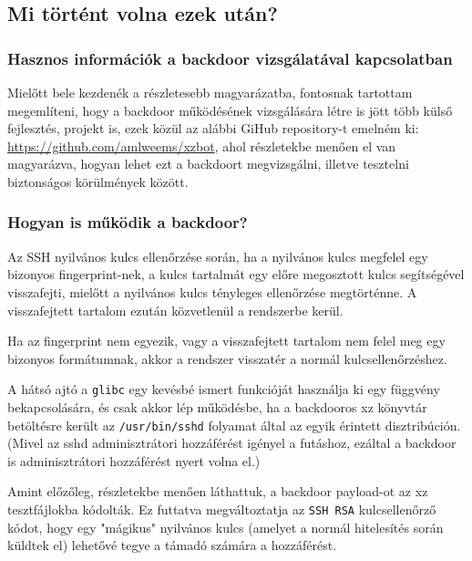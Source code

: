 \documentclass[11pt]{article}
\begin{document}
\subsection{Mi történt volna ezek után?}

\subsubsection{Hasznos információk a backdoor vizsgálatával kapcsolatban}

Mielőtt bele kezdenék a részletesebb magyarázatba, fontosnak tartottam megemlíteni, hogy a backdoor működésének vizsgálására létre is jött több külső fejlesztés, projekt is, ezek közül az alábbi GiHub repository-t emelném ki: \href{https://github.com/amlweems/xzbot?tab=readme-ov-file#backdoor-format}{https://github.com/amlweems/xzbot}, ahol részletekbe menően el van magyarázva, hogyan lehet ezt a backdoort megvizsgálni, illetve tesztelni biztonságos körülmények között.

\subsubsection{Hogyan is működik a backdoor?}

Az SSH nyilvános kulcs ellenőrzése során, ha a nyilvános kulcs megfelel egy bizonyos fingerprint-nek, a kulcs tartalmát egy előre megosztott kulcs segítségével visszafejti, mielőtt a nyilvános kulcs tényleges ellenőrzése megtörténne. A visszafejtett tartalom ezután közvetlenül a rendszerbe kerül.

Ha az fingerprint nem egyezik, vagy a visszafejtett tartalom nem felel meg egy bizonyos formátumnak, akkor a rendszer visszatér a normál kulcsellenőrzéshez.

A hátsó ajtó a \lstinline{glibc} egy kevésbé ismert funkcióját használja ki egy függvény bekapcsolására, és csak akkor lép működésbe, ha a backdooros xz könyvtár betöltésre került az \lstinline{/usr/bin/sshd} folyamat által az egyik érintett disztribúción. (Mivel az sshd adminisztrátori hozzáférést igényel a futáshoz, ezáltal a backdoor is adminisztrátori hozzáférést nyert volna el.)

Amint előzőleg, részletekbe menően láthattuk, a backdoor payload-ot az xz tesztfájlokba kódolták. Ez futtatva megváltoztatja az \lstinline{SSH RSA} kulcsellenőrző kódot, hogy egy "mágikus" nyilvános kulcs (amelyet a normál hitelesítés során küldtek el) lehetővé tegye a támadó számára a hozzáférést.\cite{Goodin_2024}
\end{document}
